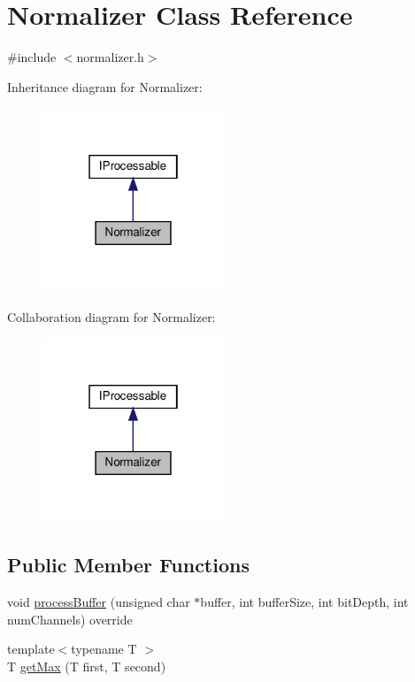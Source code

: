 \hypertarget{classNormalizer}{}\section{Normalizer Class Reference}
\label{classNormalizer}


{\ttfamily \#include $<$normalizer.\+h$>$}



Inheritance diagram for Normalizer\+:\nopagebreak
\begin{figure}[H]
\begin{center}
\leavevmode
\includegraphics[width=154pt]{dd/d2d/classNormalizer__inherit__graph}
\end{center}
\end{figure}


Collaboration diagram for Normalizer\+:\nopagebreak
\begin{figure}[H]
\begin{center}
\leavevmode
\includegraphics[width=154pt]{d9/da8/classNormalizer__coll__graph}
\end{center}
\end{figure}
\subsection*{Public Member Functions}
\begin{DoxyCompactItemize}
\item 
void \hyperlink{classNormalizer_ab17632635876ca5cf6da795525889761}{process\+Buffer} (unsigned char $\ast$buffer, int buffer\+Size, int bit\+Depth, int num\+Channels) override
\item 
{\footnotesize template$<$typename T $>$ }\\T \hyperlink{classNormalizer_a032dc937c5feeb167e5095f624434637}{get\+Max} (T first, T second)
\end{DoxyCompactItemize}


